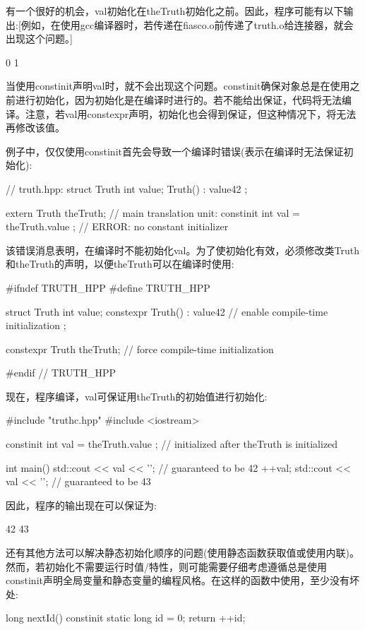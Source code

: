 有一个很好的机会，val初始化在theTruth初始化之前。因此，程序可能有以下输出:[例如，在使用gcc编译器时，若传递在fiasco.o前传递了truth.o给连接器，就会出现这个问题。]

\begin{shell}
0 
1
\end{shell}

当使用constinit声明val时，就不会出现这个问题。constinit确保对象总是在使用之前进行初始化，因为初始化是在编译时进行的。若不能给出保证，代码将无法编译。注意，若val用constexpr声明，初始化也会得到保证，但这种情况下，将无法再修改该值。

例子中，仅仅使用constinit首先会导致一个编译时错误(表示在编译时无法保证初始化):

\begin{cpp}
// truth.hpp:
struct Truth {
	int value;
	Truth() : value{42} {
	}
};

extern Truth theTruth;
// main translation unit:
constinit int val = theTruth.value ; // ERROR: no constant initializer
\end{cpp}

该错误消息表明，在编译时不能初始化val。为了使初始化有效，必须修改类Truth和theTruth的声明，以便theTruth可以在编译时使用:


\begin{cpp}
#ifndef TRUTH_HPP
#define TRUTH_HPP

struct Truth {
	int value;
	constexpr Truth() : value{42} { // enable compile-time initialization
	}
};

constexpr Truth theTruth; // force compile-time initialization

#endif // TRUTH_HPP
\end{cpp}

现在，程序编译，val可保证用theTruth的初始值进行初始化:


\begin{cpp}
#include "truthc.hpp"
#include <iostream>

constinit int val = theTruth.value ; // initialized after theTruth is initialized

int main()
{
	std::cout << val << '\n'; // guaranteed to be 42
	++val;
	std::cout << val << '\n'; // guaranteed to be 43
}
\end{cpp}

因此，程序的输出现在可以保证为:

\begin{shell}
42
43
\end{shell}

还有其他方法可以解决静态初始化顺序的问题(使用静态函数获取值或使用内联)。然而，若初始化不需要运行时值/特性，则可能需要仔细考虑遵循总是使用constinit声明全局变量和静态变量的编程风格。在这样的函数中使用，至少没有坏处:

\begin{cpp}
long nextId()
{
	constinit static long id = 0;
	return ++id;
}
\end{cpp}








